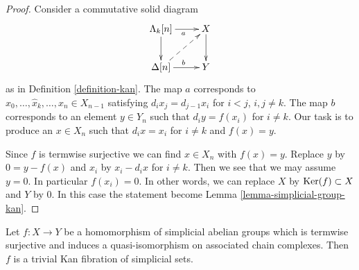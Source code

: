 \begin{proof}
Consider a commutative solid diagram
$$
\xymatrix{
\Lambda_k[n] \ar[r]_a \ar[d] & X \ar[d] \\
\Delta[n] \ar[r]^b \ar@{-->}[ru] & Y
}
$$
as in Definition \ref{definition-kan}. The map $a$ corresponds
to $x_0, \ldots, \hat x_k, \ldots, x_n \in X_{n - 1}$ satisfying
$d_i x_j = d_{j - 1} x_i$ for $i < j$, $i, j \not = k$.
The map $b$ corresponds to an element $y \in Y_n$ such
that $d_iy = f(x_i)$ for $i \not = k$. Our task is to produce an
$x \in X_n$ such that $d_ix = x_i$ for $i \not = k$ and $f(x) = y$.

\medskip\noindent
Since $f$ is termwise surjective we can find $x \in X_n$ with $f(x) = y$.
Replace $y$ by $0 = y - f(x)$ and $x_i$ by $x_i - d_ix$ for $i \not = k$.
Then we see that we may assume $y = 0$. In particular $f(x_i) = 0$.
In other words, we can replace $X$ by $\mathop{\mathrm{Ker}}(f) \subset X$
and $Y$ by $0$. In this case the statement become
Lemma \ref{lemma-simplicial-group-kan}.
\end{proof}

\begin{lemma}
\label{lemma-qis-simplicial-abelian-groups}
Let $f : X \to Y$ be a homomorphism of simplicial abelian groups
which is termwise surjective and induces a quasi-isomorphism on
associated chain complexes. Then $f$ is a trivial Kan fibration of
simplicial sets.
\end{lemma}

